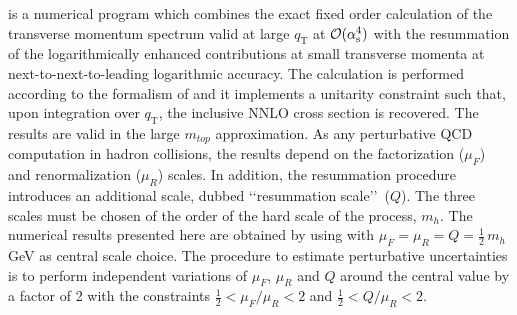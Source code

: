 \subsubsection{\HqT}
\label{sec:hjetscomp:tools:ares:hqt}

\HqT \cite{Bozzi:2005wk,deFlorian:2011xf} is a numerical program which 
combines the exact fixed order calculation of the transverse momentum 
spectrum valid at large $q_\text{T}$ at ${\cal O}(\alpha_\mathrm{s}^4)$ with the 
resummation of the logarithmically enhanced contributions at small 
transverse momenta at next-to-next-to-leading logarithmic accuracy.
The calculation is performed according to the formalism of 
\cite{Catani:2000vq,Bozzi:2005wk} and it implements a unitarity 
constraint such that, upon integration over $q_\text{T}$, the inclusive 
NNLO cross section is recovered. The results are valid in the large 
$m_{top}$ approximation. As any perturbative QCD computation in hadron 
collisions, the results depend on the factorization ($\mu_F$) and 
renormalization ($\mu_R$) scales. In addition, the resummation procedure 
introduces an additional scale, dubbed \lq\lq resummation scale\rq\rq\ 
($Q$). The three scales must be chosen of the order of the hard scale 
of the process, $m_h$. The numerical results presented here are obtained 
by using \HqT-2.0 with $\mu_F=\mu_R=Q=\tfrac{1}{2}\,m_h$ GeV as central scale choice. 
The procedure to estimate perturbative uncertainties is to perform 
independent variations of $\mu_F$, $\mu_R$ and $Q$ around the central 
value by a factor of 2 with the constraints $\tfrac{1}{2} < \mu_F/\mu_R < 2$ and 
$\tfrac{1}{2} <Q/\mu_R<2$.